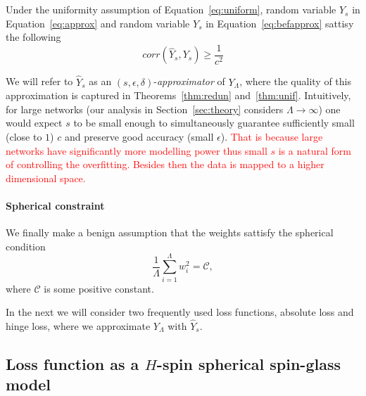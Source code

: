 \documentclass[twoside]{article}
\begin{document}
\begin{theorem}
Under the uniformity assumption of Equation~\ref{eq:uniform}, random variable $\hat{Y}_s$ in Equation~\ref{eq:approx} and random variable $Y_s$ in Equation~\ref{eq:befapprox} sattisy the following
\[corr(\hat{Y}_s,Y_s) \geq \frac{1}{c^2}
\]
\label{thm:unif}
\end{theorem}
We will refer to $\hat{Y}_s$ as an $(s,\epsilon,\delta)$-\textit{approximator} of $Y_{\Lambda}$, where the quality of this approximation is captured in Theorems~\ref{thm:redun} and~\ref{thm:unif}. Intuitively, for large networks (our analysis in Section~\ref{sec:theory} considers $\Lambda \rightarrow \infty$) one would expect $s$ to be small enough to simultaneously guarantee sufficiently small (close to $1$) $c$ and preserve good accuracy (small $\epsilon$). \textcolor{red}{That is because large networks have significantly more modelling power thus small $s$ is a natural form of controlling the overfitting. Besides then the data is mapped to a higher dimensional space.} 

\paragraph{Spherical constraint}
We finally make a benign assumption that the weights sattisfy the spherical condition 
\begin{equation}
\frac{1}{\Lambda}\sum_{i=1}^{\Lambda}w_i^2 = \mathcal{C},
\label{eq:befspherical}
\end{equation}
where $\mathcal{C}$ is some positive constant. 

In the next we will consider two frequently used loss functions, absolute loss and hinge loss, where we approximate $Y_{\Lambda}$ with $\hat{Y}_s$. 

\subsection{Loss function as a $H$-spin spherical spin-glass model}
\label{subsec:LFSG}
\end{document}
